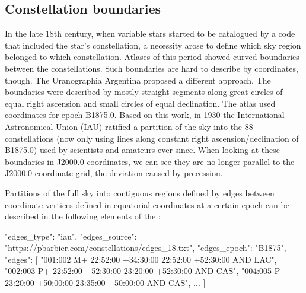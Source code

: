 \subsection{Constellation boundaries}
\label{SC:boundaries}
\label{SC:edges}


In the late 18th century, when variable stars started to be catalogued by a code that included the star's constellation, 
a necessity arose to define which sky region belonged to which constellation. 
Atlases of this period showed curved boundaries between the constellations. 
Such boundaries are hard to describe by coordinates, though. The Uranographia Argentina \citep{1879RNAO....1....1G} proposed a different approach.
The boundaries were described by mostly straight segments along great circles of equal right ascension and small circles of equal declination. 
The atlas used coordinates for epoch B1875.0. 
Based on this work, in 1930 the International Astronomical Union (IAU) ratified a partition of the sky into the 88 constellations 
(now only using lines along constant right ascension/declination of B1875.0) used by scientists and amateurs ever since.
When looking at these boundaries in J2000.0 coordinates, we can see they are no longer parallel to the J2000.0 coordinate grid, the deviation caused by precession. 

Partitions of the full sky into contiguous regions defined by edges between coordinate vertices defined in  
equatorial coordinates at a certain  epoch can be described in the following elements of the :

\begin{jsonfile}[\scriptsize]
  "edges_type": "iau",
  "edges_source": "https://pbarbier.com/constellations/edges_18.txt",
  "edges_epoch": "B1875",
  "edges": [
    "001:002 M+ 22:52:00 +34:30:00 22:52:00 +52:30:00 AND LAC",
    "002:003 P+ 22:52:00 +52:30:00 23:20:00 +52:30:00 AND CAS",
    "004:005 P+ 23:20:00 +50:00:00 23:35:00 +50:00:00 AND CAS",
	...
	]
\end{jsonfile}



